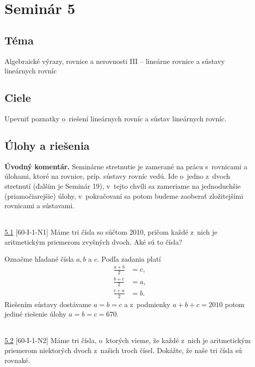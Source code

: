 \section*{Seminár 5}


\subsection*{Téma}
Algebraické výrazy, rovnice a nerovnosti III -- lineárne rovnice a sústavy lineárnych rovníc

\subsection*{Ciele}
Upevniť poznatky o~riešení lineárnych rovníc a sústav lineárnych rovníc.

\subsection*{Úlohy a riešenia}

\textbf{Úvodný komentár.} Seminárne stretnutie je zamerané na prácu s~rovnicami a úlohami, ktoré na rovnice, príp. sústavy rovníc vedú. Ide o~jedno z~dvoch stretnutí (ďalším je Seminár 19), v~tejto chvíli sa zameriame na jednoduchšie (priamočiarejšie) úlohy, v~pokračovaní sa potom budeme zaoberať zložitejšími rovnicami a sústavami.\\
\\
\begin{tcolorbox}[breakable,notitle,boxrule=0pt,colback=light-gray,colframe=light-gray]\ul{5.1} [60-I-1-N1] Máme tri čísla so súčtom 2010, pričom každé z~nich je aritmetickým priemerom zvyšných dvoch. Aké sú to čísla?

\end{tcolorbox}

\rie Označme hľadané čísla $a,b$ a $c$. Podľa zadania platí
\begin{align*}
\frac{a+b}{2} &=c,\\
\frac{b+c}{2} &=a,\\
\frac{c+a}{2} &=b.
\end{align*}
Riešením sústavy dostávame $a=b=c$ a z~podmienky $a+b+c=2010$ potom jediné riešenie úlohy $a=b=c=670$.\\
\\
\begin{tcolorbox}[breakable,notitle,boxrule=0pt,colback=light-gray,colframe=light-gray]\ul{5.2} [60-I-1-N2] Máme tri čísla, o~ktorých vieme, že každé z~nich je aritmetickým priemerom niektorých dvoch z~našich troch čísel. Dokážte, že naše tri čísla sú rovnaké.

\end{tcolorbox}

